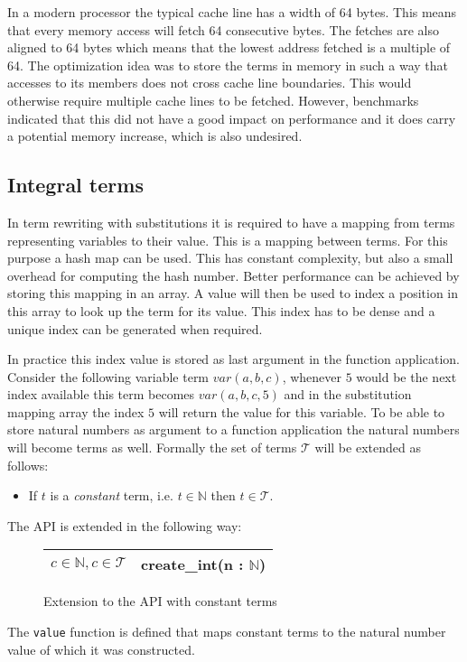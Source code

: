 \documentclass[10pt,a4paper]{article}
\newcommand{\naturalnumbers}{\mathbb{N}}
\newcommand{\terms}{\mathcal{T}}
\begin{document}
In a modern processor the typical cache line has a width of 64 bytes.
This means that every memory access will fetch 64 consecutive bytes. 
The fetches are also aligned to 64 bytes which means that the lowest address fetched is a multiple of 64. 
The optimization idea was to store the terms in memory in such a way that accesses to its members does not cross cache line boundaries. 
This would otherwise require multiple cache lines to be fetched.
However, benchmarks indicated that this did not have a good impact on performance and it does carry a potential memory increase, which is also undesired.

\subsection{Integral terms}

In term rewriting with substitutions it is required to have a mapping from terms representing variables to their value. 
This is a mapping between terms. 
For this purpose a hash map can be used. 
This has constant complexity, but also a small overhead for computing the hash number. 
Better performance can be achieved by storing this mapping in an array. 
A value will then be used to index a position in this array to look up the term for its value. 
This index has to be dense and a unique index can be generated when required.

In practice this index value is stored as last argument in the function application. 
Consider the following variable term $var(a, b, c)$, whenever $5$ would be the next index available this term becomes $var(a, b, c, 5)$ and in the substitution mapping array the index $5$ will return the value for this variable.
To be able to store natural numbers as argument to a function application the natural numbers will become terms as well. 
Formally the set of terms $\terms$ will be extended as follows:

\begin{itemize}
  \item If $t$ is a \emph{constant} term, i.e. $t \in \naturalnumbers$ then $t \in \terms$.
\end{itemize}

\noindent The API is extended in the following way:

\begin{figure}[H]
  \begin{center}
    \begin{tabular}{|l|l|}
      \hline
      $c \in \naturalnumbers, c \in \terms$ & create\_int(n : $\naturalnumbers$) \\ \hline
    \end{tabular}
  \end{center}
  \caption{Extension to the API with constant terms}
\end{figure}

\noindent The \texttt{value} function is defined that maps constant terms to the natural number value of which it was constructed.
\end{document}
